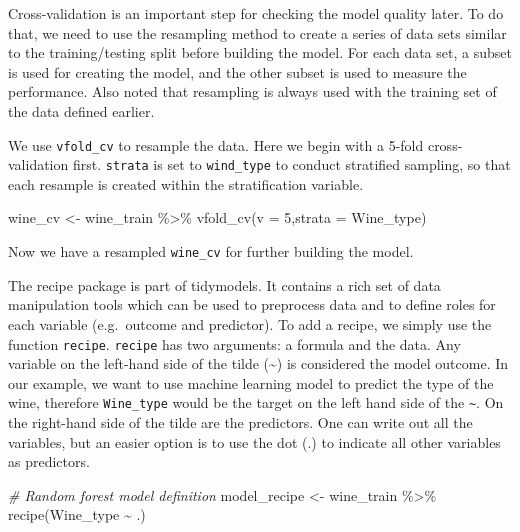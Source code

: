 \documentclass[
]{book}
\newenvironment{Shaded}{\begin{snugshade}}{\end{snugshade}}
\newcommand{\AttributeTok}[1]{\textcolor[rgb]{0.77,0.63,0.00}{#1}}
\newcommand{\CommentTok}[1]{\textcolor[rgb]{0.56,0.35,0.01}{\textit{#1}}}
\newcommand{\DecValTok}[1]{\textcolor[rgb]{0.00,0.00,0.81}{#1}}
\newcommand{\FunctionTok}[1]{\textcolor[rgb]{0.00,0.00,0.00}{#1}}
\newcommand{\NormalTok}[1]{#1}
\newcommand{\OtherTok}[1]{\textcolor[rgb]{0.56,0.35,0.01}{#1}}
\newcommand{\SpecialCharTok}[1]{\textcolor[rgb]{0.00,0.00,0.00}{#1}}
\begin{document}
Cross-validation is an important step for checking the model quality later. To do that, we need to use the resampling method to create a series of data sets similar to the training/testing split before building the model. For each data set, a subset is used for creating the model, and the other subset is used to measure the performance. Also noted that resampling is always used with the training set of the data defined earlier.

We use \texttt{vfold\_cv} to resample the data. Here we begin with a 5-fold cross-validation first. \texttt{strata} is set to \texttt{wind\_type} to conduct stratified sampling, so that each resample is created within the stratification variable.

\begin{Shaded}
\begin{Highlighting}[]
\NormalTok{wine\_cv }\OtherTok{\textless{}{-}}\NormalTok{ wine\_train }\SpecialCharTok{\%\textgreater{}\%} \FunctionTok{vfold\_cv}\NormalTok{(}\AttributeTok{v =} \DecValTok{5}\NormalTok{,}\AttributeTok{strata =}\NormalTok{ Wine\_type)}
\end{Highlighting}
\end{Shaded}

Now we have a resampled \texttt{wine\_cv} for further building the model.

The recipe package is part of tidymodels. It contains a rich set of data manipulation tools which can be used to preprocess data and to define roles for each variable (e.g.~outcome and predictor). To add a recipe, we simply use the function \texttt{recipe}. \texttt{recipe} has two arguments: a formula and the data. Any variable on the left-hand side of the tilde (\textasciitilde) is considered the model outcome. In our example, we want to use machine learning model to predict the type of the wine, therefore \texttt{Wine\_type} would be the target on the left hand side of the \texttt{\textasciitilde{}}. On the right-hand side of the tilde are the predictors. One can write out all the variables, but an easier option is to use the dot (.) to indicate all other variables as predictors.

\begin{Shaded}
\begin{Highlighting}[]
\CommentTok{\# Random forest model definition}
\NormalTok{model\_recipe }\OtherTok{\textless{}{-}}\NormalTok{ wine\_train }\SpecialCharTok{\%\textgreater{}\%} 
  \FunctionTok{recipe}\NormalTok{(Wine\_type }\SpecialCharTok{\textasciitilde{}}\NormalTok{ .)}
\end{Highlighting}
\end{Shaded}
\end{document}
